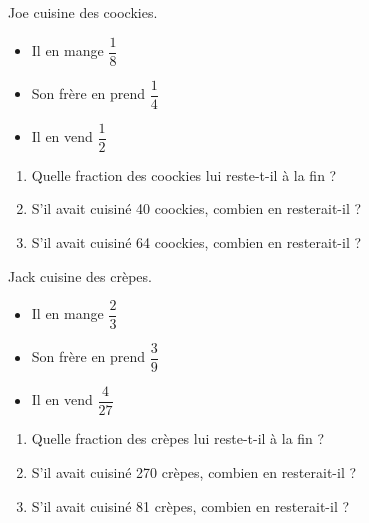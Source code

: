 
\begin{minipage}[t]{0.45\textwidth}

Joe cuisine des coockies. 
\begin{itemize}
    \item Il en mange $\dfrac{1}{8}$
    \item Son frère en prend $\dfrac{1}{4}$
    \item Il en vend $\dfrac{1}{2}$
\end{itemize}
\begin{enumerate}
    \item Quelle fraction des coockies lui reste-t-il à la fin ?
    \item S'il avait cuisiné 40 coockies, combien en resterait-il ?
    \item S'il avait cuisiné 64 coockies, combien en resterait-il ?
\end{enumerate}
\end{minipage}
\hfil
\vrule
\hfil
\begin{minipage}[t]{0.45\textwidth}

Jack cuisine des crèpes. 
\begin{itemize}
    \item Il en mange $\dfrac{2}{3}$
    \item Son frère en prend $\dfrac{3}{9}$
    \item Il en vend $\dfrac{4}{27}$
\end{itemize}
\begin{enumerate}
    \item Quelle fraction des crèpes lui reste-t-il à la fin ?
    \item S'il avait cuisiné 270 crèpes, combien en resterait-il ?
    \item S'il avait cuisiné 81 crèpes, combien en resterait-il ?
\end{enumerate}
\end{minipage}

